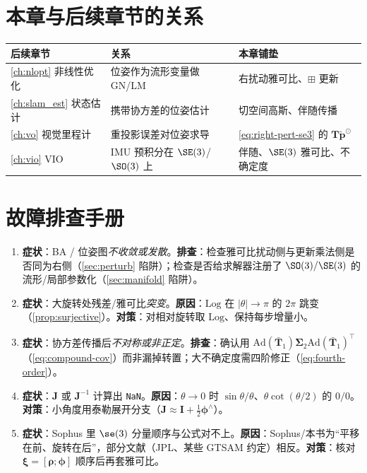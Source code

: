\section*{本章与后续章节的关系}
\begin{table}[H]\centering\small
\begin{tabular}{lll}
\toprule
后续章节 & 关系 & 本章铺垫 \\
\midrule
\cref{ch:nlopt} 非线性优化 & 位姿作为流形变量做 GN/LM & 右扰动雅可比、$\boxplus$ 更新 \\
\cref{ch:slam_est} 状态估计 & 携带协方差的位姿估计 & 切空间高斯、伴随传播 \\
\cref{ch:vo} 视觉里程计 & 重投影误差对位姿求导 & \cref{eq:right-pert-se3} 的 $\mathbf{T}\tilde{\mathbf{p}}^\odot$ \\
\cref{ch:vio} VIO & IMU 预积分在 $\SE(3)$/$\SO(3)$ 上 & 伴随、$\SE(3)$ 雅可比、不确定度 \\
\bottomrule
\end{tabular}
\end{table}

\section*{故障排查手册}
\begin{enumerate}
  \item \textbf{症状}：BA / 位姿图\emph{不收敛或发散}。\textbf{排查}：检查雅可比扰动侧与更新乘法侧是否同为右侧（\cref{sec:perturb} 陷阱）；检查是否给求解器注册了 $\SO(3)/\SE(3)$ 的流形/局部参数化（\cref{sec:manifold} 陷阱）。
  \item \textbf{症状}：大旋转处残差/雅可比\emph{突变}。\textbf{原因}：$\mathrm{Log}$ 在 $|\theta|\to\pi$ 的 $2\pi$ 跳变（\cref{prop:surjective}）。\textbf{对策}：对相对旋转取 $\mathrm{Log}$、保持每步增量小。
  \item \textbf{症状}：协方差传播后\emph{不对称或非正定}。\textbf{排查}：确认用 $\mathrm{Ad}(\bar{\mathbf{T}}_1)\boldsymbol{\Sigma}_2\mathrm{Ad}(\bar{\mathbf{T}}_1)^\top$（\cref{eq:compound-cov}）而非漏掉转置；大不确定度需四阶修正（\cref{eq:fourth-order}）。
  \item \textbf{症状}：$\mathbf{J}$ 或 $\mathbf{J}^{-1}$ 计算出 \texttt{NaN}。\textbf{原因}：$\theta\to0$ 时 $\sin\theta/\theta$、$\theta\cot(\theta/2)$ 的 $0/0$。\textbf{对策}：小角度用泰勒展开分支（$\mathbf{J}\approx\mathbf{I}+\tfrac12\boldsymbol{\phi}^\wedge$）。
  \item \textbf{症状}：Sophus 里 $\se(3)$ 分量顺序与公式对不上。\textbf{原因}：Sophus/本书为“平移在前、旋转在后”，部分文献（JPL、某些 GTSAM 约定）相反。\textbf{对策}：核对 $\boldsymbol{\xi}=[\boldsymbol{\rho};\boldsymbol{\phi}]$ 顺序后再套雅可比。
\end{enumerate}
